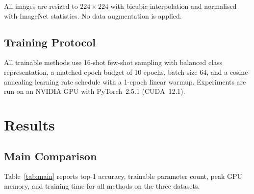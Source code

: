 \documentclass[10pt,twocolumn,letterpaper]{article}
\begin{document}
All images are resized to $224 \times 224$ with bicubic interpolation and normalised with ImageNet statistics.  No data augmentation is applied.


\subsection{Training Protocol}\label{sec:protocol}

All trainable methods use 16-shot few-shot sampling with balanced class representation, a matched epoch budget of 10 epochs, batch size 64, and a cosine-annealing learning rate schedule with a 1-epoch linear warmup.
Experiments are run on an NVIDIA GPU with PyTorch~2.5.1 (CUDA~12.1).


\section{Results}\label{sec:results}


\subsection{Main Comparison}\label{sec:main-results}

Table~\ref{tab:main} reports top-1 accuracy, trainable parameter count, peak GPU memory, and training time for all methods on the three datasets.
\end{document}
